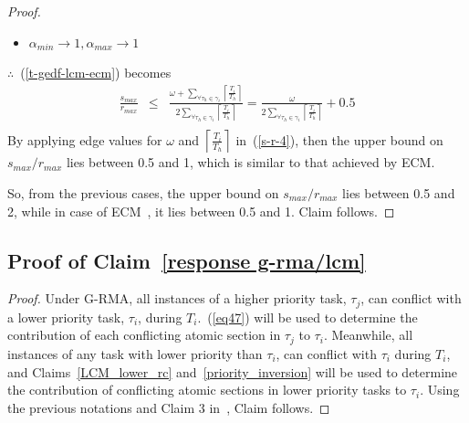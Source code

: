 \documentclass[conference]{sig-alternate}
\begin{document}
\begin{proof}
\begin{itemize}
\item $\alpha_{min} \rightarrow 1, \alpha_{max} \rightarrow 1$
\end{itemize}
$\therefore$~(\ref{t-gedf-lcm-ecm}) becomes
\begin{eqnarray}
\frac{s_{max}}{r_{max}}& \le & \frac{\omega+\sum_{\forall \tau_h \in \gamma_i}\left\lceil\frac{T_i}{T_h}\right\rceil}{2\sum_{\forall \tau_h \in \gamma_i}\left\lceil\frac{T_i}{T_h}\right\rceil} = \frac{\omega}{2\sum_{\forall \tau_h \in \gamma_i}\left\lceil\frac{T_i}{T_h}\right\rceil}+0.5\nonumber\\
\label{s-r-4}\end{eqnarray}
By applying edge values for $\omega$ and $\left\lceil\frac{T_i}{T_h}\right\rceil$ in~(\ref{s-r-4}), then the upper bound on $s_{max}/r_{max}$ lies between 0.5 and 1, which is similar to that achieved by ECM.

So, from the previous cases, the upper bound on $s_{max}/r_{max}$ lies between 0.5 and 2, while in case of ECM~\cite{stmconcurrencycontrol:emsoft11}, it lies between 0.5 and 1. Claim follows.
\end{proof}

\subsection{\label{proof_response g-rma/lcm}Proof of Claim~\ref{response g-rma/lcm}}
\begin{proof}
Under G-RMA, all instances of a higher priority task, $\tau_{j}$, can conflict with a lower priority task,
$\tau_{i}$, during $T_{i}$.~(\ref{eq47}) will be used to determine the contribution of each conflicting atomic section in $\tau_j$ to $\tau_i$. Meanwhile, all instances of any task with lower priority than $\tau_{i}$, can conflict with $\tau_i$ during $T_{i}$, and Claims~\ref{LCM_lower_rc} and~\ref{priority_inversion} will be used to determine the contribution of conflicting atomic sections in lower priority tasks to $\tau_i$.
%
Using the previous notations and Claim 3 in~\cite{stmconcurrencycontrol:emsoft11}, Claim follows.
\end{proof}
\end{document}
